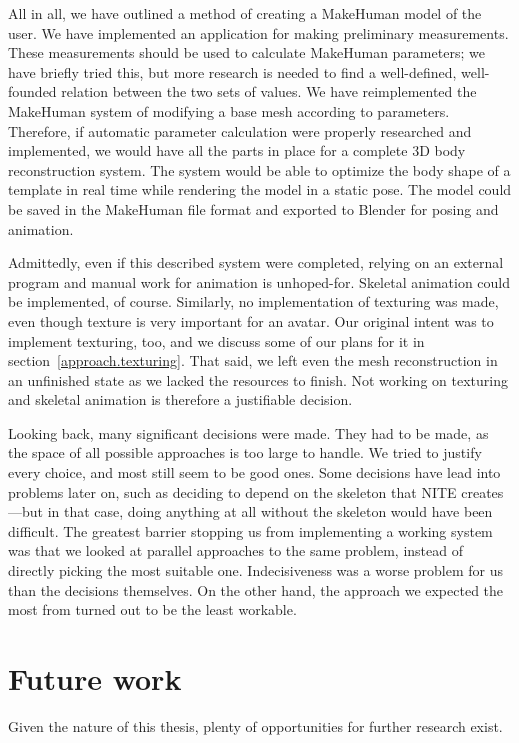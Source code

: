 All in all, we have outlined a method of creating a MakeHuman model of the user. We have implemented an application for making preliminary measurements. These measurements should be used to calculate MakeHuman parameters; we have briefly tried this, but more research is needed to find a well-defined, well-founded relation between the two sets of values. We have reimplemented the MakeHuman system of modifying a base mesh according to parameters. Therefore, if automatic parameter calculation were properly researched and implemented, we would have all the parts in place for a complete 3D body reconstruction system. The system would be able to optimize the body shape of a template in real time while rendering the model in a static pose. The model could be saved in the MakeHuman file format and exported to Blender for posing and animation.

Admittedly, even if this described system were completed, relying on an external program and manual work for animation is unhoped-for. Skeletal animation could be implemented, of course. Similarly, no implementation of texturing was made, even though texture is very important for an avatar. Our original intent was to implement texturing, too, and we discuss some of our plans for it in section~\ref{approach.texturing}. That said, we left even the mesh reconstruction in an unfinished state as we lacked the resources to finish. Not working on texturing and skeletal animation is therefore a justifiable decision.

Looking back, many significant decisions were made. They had to be made, as the space of all possible approaches is too large to handle. We tried to justify every choice, and most still seem to be good ones. Some decisions have lead into problems later on, such as deciding to depend on the skeleton that NITE creates---but in that case, doing anything at all without the skeleton would have been difficult. The greatest barrier stopping us from implementing a working system was that we looked at parallel approaches to the same problem, instead of directly picking the most suitable one. Indecisiveness was a worse problem for us than the decisions themselves. On the other hand, the approach we expected the most from turned out to be the least workable.

\section{Future work}

Given the nature of this thesis, plenty of opportunities for further research exist.

